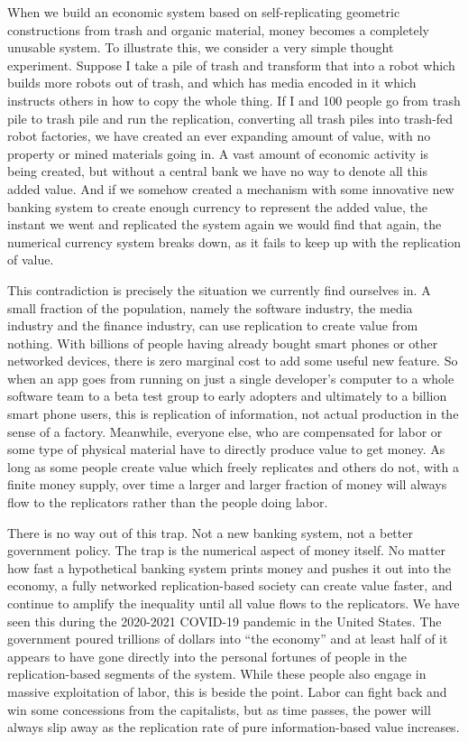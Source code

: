 When we build an economic system based on self-replicating geometric
constructions from trash and organic material, money becomes a
completely unusable system. To illustrate this, we consider a very
simple thought experiment. Suppose I take a pile of trash and transform
that into a robot which builds more robots out of trash, and which has
media encoded in it which instructs others in how to copy the whole
thing. If I and 100 people go from trash pile to trash pile and run the
replication, converting all trash piles into trash-fed robot factories,
we have created an ever expanding amount of value, with no property or
mined materials going in. A vast amount of economic activity is being
created, but without a central bank we have no way to denote all this
added value. And if we somehow created a mechanism with some innovative
new banking system to create enough currency to represent the added
value, the instant we went and replicated the system again we would find
that again, the numerical currency system breaks down, as it fails to
keep up with the replication of value.

This contradiction is precisely the situation we currently find
ourselves in. A small fraction of the population, namely the software
industry, the media industry and the finance industry, can use
replication to create value from nothing. With billions of people having
already bought smart phones or other networked devices, there is zero
marginal cost to add some useful new feature. So when an app goes from
running on just a single developer's computer to a whole software team
to a beta test group to early adopters and ultimately to a billion smart
phone users, this is replication of information, not actual production
in the sense of a factory. Meanwhile, everyone else, who are compensated
for labor or some type of physical material have to directly produce
value to get money. As long as some people create value which freely
replicates and others do not, with a finite money supply, over time a
larger and larger fraction of money will always flow to the replicators
rather than the people doing labor.

There is no way out of this trap. Not a new banking system, not a better
government policy. The trap is the numerical aspect of money itself. No
matter how fast a hypothetical banking system prints money and pushes it
out into the economy, a fully networked replication-based society can
create value faster, and continue to amplify the inequality until all
value flows to the replicators. We have seen this during the 2020-2021
COVID-19 pandemic in the United States. The government poured trillions
of dollars into ``the economy'' and at least half of it appears to have
gone directly into the personal fortunes of people in the
replication-based segments of the system. While these people also engage
in massive exploitation of labor, this is beside the point. Labor can
fight back and win some concessions from the capitalists, but as time
passes, the power will always slip away as the replication rate of pure
information-based value increases.

